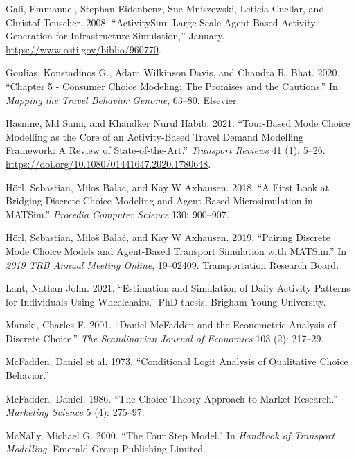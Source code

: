 \documentclass[12pt, oneside, openright]{byuthesis}
\newlength{\cslhangindent}
\newlength{\cslentryspacingunit} %
\newenvironment{CSLReferences}[2] %
 {%
  \setlength{\parindent}{0pt}
  \ifodd #1
  \let\oldpar\par
  \def\par{\hangindent=\cslhangindent\oldpar}
  \fi
  \setlength{\parskip}{#2\cslentryspacingunit}
 }%
 {}
\begin{document}
\begin{CSLReferences}{1}{0}
\leavevmode{}%
Gali, Emmanuel, Stephan Eidenbenz, Sue Mniszewski, Leticia Cuellar, and Christof Teuscher. 2008. {``ActivitySim: Large-Scale Agent Based Activity Generation for Infrastructure Simulation,''} January. \url{https://www.osti.gov/biblio/960770}.

\leavevmode{}%
Goulias, Konstadinos G., Adam Wilkinson Davis, and Chandra R. Bhat. 2020. {``Chapter 5 - Consumer Choice Modeling: The Promises and the Cautions.''} In \emph{Mapping the Travel Behavior Genome}, 63--80. Elsevier.

\leavevmode{}%
Hasnine, Md Sami, and Khandker Nurul Habib. 2021. {``Tour-Based Mode Choice Modelling as the Core of an Activity-Based Travel Demand Modelling Framework: A Review of State-of-the-Art.''} \emph{Transport Reviews} 41 (1): 5--26. \url{https://doi.org/10.1080/01441647.2020.1780648}.

\leavevmode{}%
Hörl, Sebastian, Milos Balac, and Kay W Axhausen. 2018. {``A First Look at Bridging Discrete Choice Modeling and Agent-Based Microsimulation in MATSim.''} \emph{Procedia Computer Science} 130: 900--907.

\leavevmode{}%
Hörl, Sebastian, Miloš Balać, and Kay W Axhausen. 2019. {``Pairing Discrete Mode Choice Models and Agent-Based Transport Simulation with MATSim.''} In \emph{2019 TRB Annual Meeting Online}, 19--02409. Transportation Research Board.

\leavevmode{}%
Lant, Nathan John. 2021. {``Estimation and Simulation of Daily Activity Patterns for Individuals Using Wheelchairs.''} PhD thesis, Brigham Young University.

\leavevmode{}%
Manski, Charles F. 2001. {``Daniel McFadden and the Econometric Analysis of Discrete Choice.''} \emph{The Scandinavian Journal of Economics} 103 (2): 217--29.

\leavevmode{}%
McFadden, Daniel et al. 1973. {``Conditional Logit Analysis of Qualitative Choice Behavior.''}

\leavevmode{}%
McFadden, Daniel. 1986. {``The Choice Theory Approach to Market Research.''} \emph{Marketing Science} 5 (4): 275--97.

\leavevmode{}%
McNally, Michael G. 2000. {``The Four Step Model.''} In \emph{Handbook of Transport Modelling}. Emerald Group Publishing Limited.


\end{CSLReferences}
\end{document}
